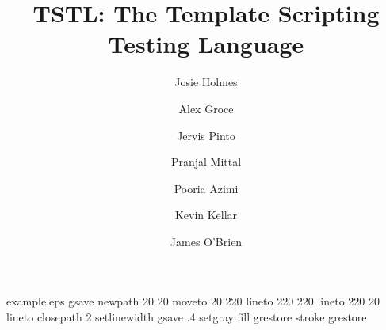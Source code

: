%
%
%
%
%
\begin{filecontents*}{example.eps}
gsave
newpath
  20 20 moveto
  20 220 lineto
  220 220 lineto
  220 20 lineto
closepath
2 setlinewidth
gsave
  .4 setgray fill
grestore
stroke
grestore
\end{filecontents*}
%
\RequirePackage{fix-cm}
%
\documentclass[smallextended]{svjour3}       %
%
\smartqed  %
%
\usepackage{graphicx}
\usepackage{url}
\usepackage{xcolor}
\usepackage{code}
\usepackage{tabularx}
%
%
%
%
%


\title{TSTL: The Template Scripting Testing Language}



\author{Josie Holmes \and
Alex Groce \and
Jervis Pinto \and
Pranjal Mittal \and
Pooria Azimi \and
Kevin Kellar \and
James O'Brien
}

